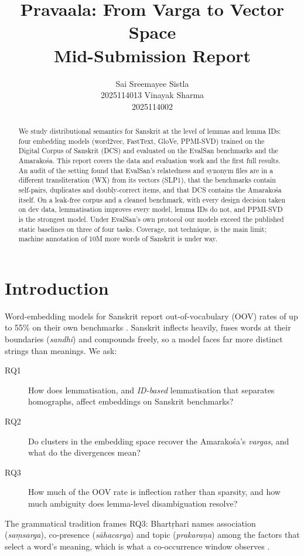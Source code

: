 \documentclass[11pt]{article}
\title{Pravaala: From Varga to Vector Space\\[2pt]
\large Mid-Submission Report}
\author{Sai Sreemayee Sistla \\ 2025114013 \And Vinayak Sharma \\ 2025114002}
\begin{document}
\maketitle

\begin{abstract}
We study distributional semantics for Sanskrit at the level of lemmas and
lemma IDs: four embedding models (word2vec, FastText, GloVe, PPMI-SVD)
trained on the Digital Corpus of Sanskrit (DCS) and evaluated on the EvalSan
benchmarks and the Amarakośa. This report covers the data and evaluation
work and the first full results. An audit of the setting found that
EvalSan's relatedness and synonym files are in a different transliteration
(WX) from its vectors (SLP1), that the benchmarks contain self-pairs,
duplicates and doubly-correct items, and that DCS contains the Amarakośa
itself. On a leak-free corpus and a cleaned benchmark, with every design
decision taken on dev data, lemmatisation improves every model, lemma IDs do
not, and PPMI-SVD is the strongest model. Under EvalSan's own protocol our
models exceed the published static baselines on three of four tasks.
Coverage, not technique, is the main limit; machine annotation of 10M more
words of Sanskrit is under way.
\end{abstract}

\section{Introduction}
Word-embedding models for Sanskrit report out-of-vocabulary (OOV) rates of up
to 55\% on their own benchmarks \citep{sandhan2023evalsan}. Sanskrit inflects
heavily, fuses words at their boundaries (\emph{sandhi}) and compounds
freely, so a model faces far more distinct strings than meanings. We ask:
\begin{description}
\item[RQ1] How does lemmatisation, and \emph{ID-based} lemmatisation that
  separates homographs, affect embeddings on Sanskrit benchmarks?
\item[RQ2] Do clusters in the embedding space recover the Amarakośa's
  \emph{vargas}, and what do the divergences mean?
\item[RQ3] How much of the OOV rate is inflection rather than sparsity, and
  how much ambiguity does lemma-level disambiguation resolve?
\end{description}
The grammatical tradition frames RQ3: Bhartṛhari
\citep{iyer1965vakyapadiya} names association (\emph{saṃsarga}),
co-presence (\emph{sāhacarya}) and topic (\emph{prakaraṇa}) among the
factors that select a word's meaning, which is what a co-occurrence window
observes \citep{harris1954,firth1957,matilal1990word}.
\end{document}
